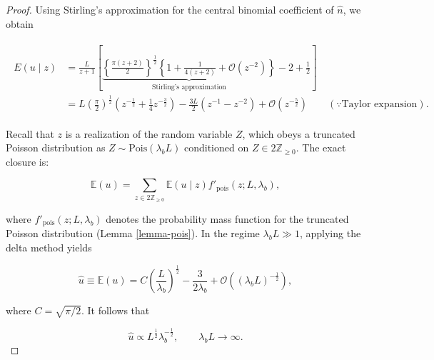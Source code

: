 \documentclass[11pt, class=article, crop=false]{standalone}
\theoremstyle{definition}
\begin{document}
\begin{proof}
Using Stirling's approximation for the central binomial coefficient of $\hat{n}$, we obtain

\begin{align}
    \begin{split}
    E(u \mid z) 
    &= 
    \frac{L}{z + 1}
    \left[
        \underbrace{
            \left\{
            \frac{\pi(z + 2)}{2}\right\}^{\frac{1}{2}}
            \left\{1 + \frac{1}{4(z + 2)} + \mathcal{O}(z^{-2})
            \right\}
        }_{\text{Stirling's approximation}}
        - 2
        + \frac{1}{2}
    \right]\\
    &= 
    L \left(\frac{\pi}{2}\right)^{\frac{1}{2}} 
    \left(
        z^{-\frac{1}{2}} + 
        \frac{1}{4}z^{-\frac{3}{2}}
    \right) -
    \frac{3L}{2}(z^{-1} - z^{-2}) + 
    \mathcal{O}(z^{-\frac{5}{2}}) 
    \qquad 
    (\because \text{Taylor expansion}).
    \end{split}
\end{align}

Recall that $z$ is a realization of the random variable $Z$, which obeys a truncated Poisson distribution as $Z \sim \text{Pois}(\lambda_b L)$ conditioned on $Z \in 2\mathbb{Z}_{\ge0}$.
The exact closure is:

\begin{equation}
    \mathbb{E}(u) = \sum_{z \in 2\mathbb{Z}_{\ge 0}} \mathbb{E}(u\mid z) f'_{\text{pois}}(z; L, \lambda_b),
\end{equation}

where $f'_{\text{pois}}(z; L, \lambda_b)$ denotes the probability mass function for the truncated Poisson distribution (Lemma \ref{lemma-pois}).
In the regime $\lambda_b L \gg 1$, applying the delta method yields

\begin{equation}
    \hat{u} \equiv \mathbb{E}(u) = C \left({\frac{L}{\lambda_b}}\right)^{\frac{1}{2}} - \frac{3}{2 \lambda_b} + \mathcal{O}((\lambda_b L)^{-\frac{1}{2}}),
\end{equation}

where $C = \sqrt{\pi/2}$.
It follows that

\begin{equation}
    \hat{u}
    \propto
    L^{\frac{1}{2}}\lambda_b^{-\frac{1}{2}},
    \qquad
    \lambda_b L \to \infty.
\end{equation}

\end{proof}
\end{document}
